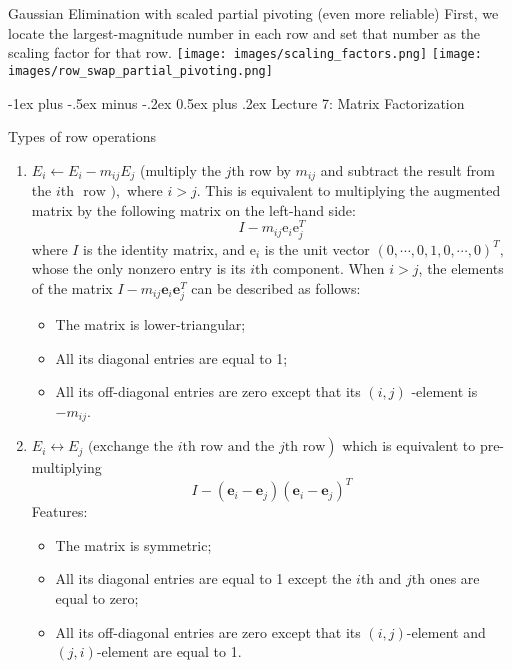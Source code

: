 \documentclass[10pt,landscape]{article}
\makeatletter
\renewcommand{\section}{\@startsection{section}{1}{0mm}%
                                {-1ex plus -.5ex minus -.2ex}%
                                {0.5ex plus .2ex}%
                                {\normalfont\large\bfseries}}
\theoremstyle{definition}
\newcommand{\thistheoremname}{}
\newtheorem*{genericthm*}{\thistheoremname}
\newenvironment{namedthm*}[1]
{\renewcommand{\thistheoremname}{#1}\begin{genericthm*}}
{\end{genericthm*}}
\makeatother
\begin{document}
\begin{multicols}{3}
\begin{namedthm*}{Gaussian Elimination with scaled partial pivoting (even more reliable)}
First, we locate the largest-magnitude number in each row and set that number as the scaling factor for that row.
\texttt{[image: images/scaling\_factors.png]}
\texttt{[image: images/row\_swap\_partial\_pivoting.png]}
\end{namedthm*}

\section{Lecture 7: Matrix Factorization}

\begin{namedthm*}{Types of row operations}
~
\begin{enumerate}
    \item $E_{i} \leftarrow E_{i}-m_{i j} E_{j}$ (multiply the $j$th row by $m_{i j}$ and subtract the result from the $i$th
$\text { row }),$ where $i>j$. This is equivalent to multiplying
the augmented matrix by the following matrix on the left-hand side: $$
I-m_{i j} \mathrm{e}_{i} \mathrm{e}_{j}^{T}
$$ where $I$ is the identity matrix, and $\mathrm{e}_{i}$ is the unit vector $(0, \cdots, 0,1,0, \cdots, 0)^{T},$ whose the only
nonzero entry is its $i$th component. When $i>j$, the elements of the matrix $I-m_{i j} \mathbf{e}_{i} \mathbf{e}_{j}^{T}$ can
be described as follows:
\begin{itemize}
    \item The matrix is lower-triangular;
    \item All its diagonal entries are equal to 1;
    \item All its off-diagonal entries are zero except that its $(i, j)$ -element is $-m_{i j}$.
\end{itemize}
\item $\left.E_{i} \leftrightarrow E_{j} \text { (exchange the } i \text {th row and the } j \text {th row}\right)$ which is equivalent to pre-multiplying
$$
I-\left(\mathbf{e}_{i}-\mathbf{e}_{j}\right)\left(\mathbf{e}_{i}-\mathbf{e}_{j}\right)^{T}
$$
Features:\begin{itemize}
    \item The matrix is symmetric;
    \item All its diagonal entries are equal to 1 except the $i$th and $j$th ones are equal to zero;
    \item All its off-diagonal entries are zero except that its $(i, j)$-element and $(j, i)$-element are equal to 1.
\end{itemize}


\end{enumerate}
\end{namedthm*}
\end{multicols}
\end{document}
